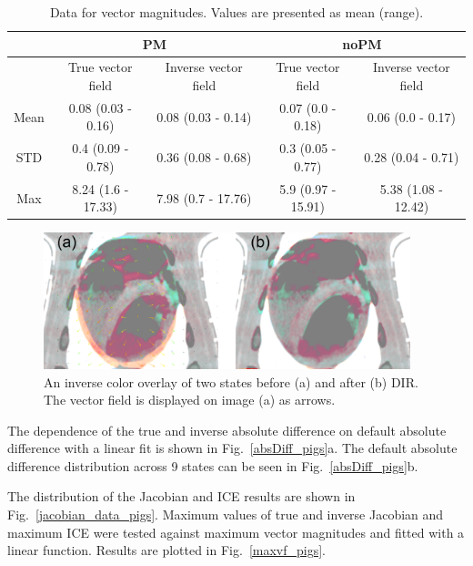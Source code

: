 \begin{table}[H]
  \centering
  \caption{Data for vector magnitudes. Values are presented as mean (range).}
  \begin{tabular}{|c|c|c|c|c|}
  \hline\hline
	    & \multicolumn{2}{|c|}{PM} & \multicolumn{2}{|c|}{noPM} \\ \hline
  
            & True vector field   & Inverse vector field   & True vector field  & Inverse vector field \\
       \hline
	Mean & 0.08 (0.03 - 0.16) & 0.08 (0.03 - 0.14) & 0.07 (0.0 - 0.18)  & 0.06 (0.0 - 0.17) \\ 
	STD  & 0.4 (0.09 - 0.78)  & 0.36 (0.08 - 0.68) & 0.3 (0.05 - 0.77)  & 0.28 (0.04 - 0.71) \\ 
	Max  & 8.24 (1.6 - 17.33) & 7.98 (0.7 - 17.76) & 5.9 (0.97 - 15.91) & 5.38 (1.08 - 12.42) \\ 
    \hline\hline
  \end{tabular}
  \label{tab:vectordata_pig}
\end{table}

\begin{figure}[H]
	\begin{center}		
		\includegraphics[width=0.95\textwidth]{./Vmm/Images/exampleReg_pigs.png}
		\caption{An inverse color overlay of two states before (a) and after (b) DIR. The vector field is displayed on image (a) as arrows.}
		\label{exampleReg_pigs}
	\end{center}
\end{figure}

The dependence of the true and inverse absolute difference on default absolute difference with a linear fit is shown in Fig.~\ref{absDiff_pigs}a. 
The default absolute difference distribution across 9 states can be seen in Fig.~\ref{absDiff_pigs}b.

The distribution of the Jacobian and ICE results are shown in Fig.~\ref{jacobian_data_pigs}. Maximum values of true and inverse Jacobian and maximum ICE were
tested against maximum vector magnitudes and fitted with a linear function. Results are plotted in Fig.~\ref{maxvf_pigs}.

